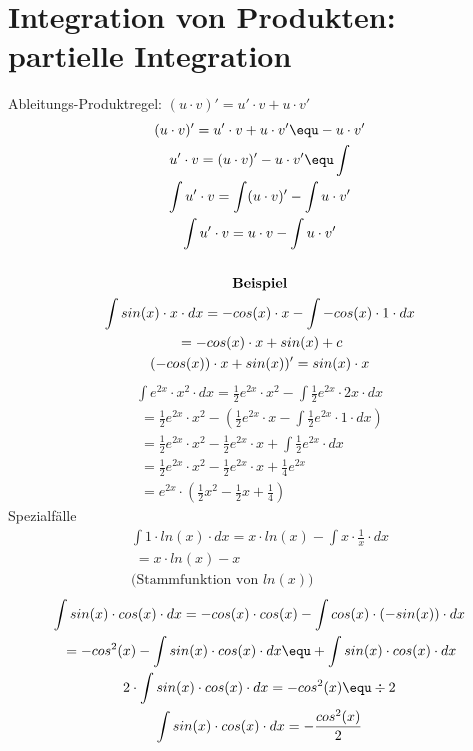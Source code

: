 \section{Integration von Produkten: partielle Integration}
Ableitungs-Produktregel: $(u \cdot v)' = u' \cdot v + u \cdot v'$
\begin{gather*}
  (u \cdot v)' = u' \cdot v + u \cdot v' \equ - u \cdot v' \\
  u' \cdot v = (u \cdot v)' - u \cdot v' \equ \int \\
  \int u' \cdot v = \int (u \cdot v)' - \int u \cdot v' \\
  \int u' \cdot v = u \cdot v - \int u \cdot v' \\\\
  \textbf{Beispiel} \\
  \int sin(x) \cdot x \cdot dx = -cos(x) \cdot x - \int -cos(x) \cdot 1 \cdot dx \\
  \;= -cos(x) \cdot x + sin(x) + c \\
  (-cos(x)) \cdot x + sin(x))' = sin(x) \cdot x
\end{gather*}
\begin{gather*}
  \int e^{2x} \cdot x^2 \cdot dx = \frac{1}{2}e^{2x} \cdot x^2 - \int \frac{1}{2}e^{2x} \cdot 2x \cdot dx \\
  \;= \frac{1}{2}e^{2x} \cdot x^2 - (\frac{1}{2}e^{2x} \cdot x - \int \frac{1}{2}e^{2x} \cdot 1 \cdot dx) \\
  \;= \frac{1}{2}e^{2x} \cdot x^2 - \frac{1}{2}e^{2x} \cdot x + \int \frac{1}{2}e^{2x} \cdot dx \\
  \;= \frac{1}{2}e^{2x} \cdot x^2 - \frac{1}{2}e^{2x} \cdot x + \frac{1}{4}e^{2x} \\
  \;= e^{2x} \cdot (\frac{1}{2}x^2 - \frac{1}{2}x + \frac{1}{4})
\end{gather*}
Spezialfälle
\begin{gather*}
  \int 1 \cdot ln(x) \cdot dx = x \cdot ln(x) - \int x \cdot \frac{1}{x} \cdot dx \\
  \;= x \cdot ln(x) - x \\
  \text{(Stammfunktion von $ln(x)$)}
\end{gather*}
\begin{gather*}
  \int sin(x) \cdot cos(x) \cdot dx = -cos(x) \cdot cos(x) - \int cos(x) \cdot (-sin(x)) \cdot dx \\
  \;= -cos^2(x) - \int sin(x) \cdot cos(x) \cdot dx \equ + \int sin(x) \cdot cos(x) \cdot dx \\
  2 \cdot \int sin(x) \cdot cos(x) \cdot dx = -cos^2(x) \equ \div 2 \\
  \int sin(x) \cdot cos(x) \cdot dx = -\frac{cos^2(x)}{2}
\end{gather*}
